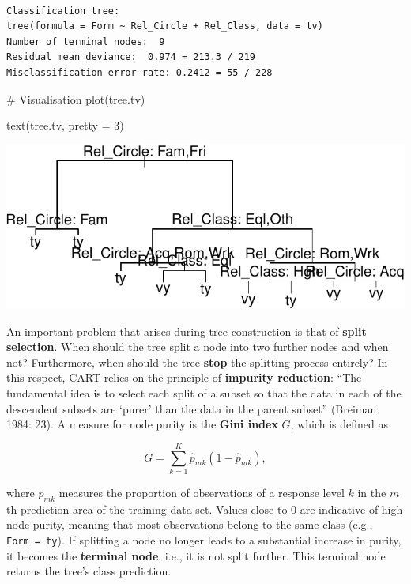 \documentclass[
  11pt,
  letterpaper,
  DIV=11,
  numbers=noendperiod]{scrreprt}
\newenvironment{Shaded}{\begin{snugshade}}{\end{snugshade}}
\newcommand{\AttributeTok}[1]{\textcolor[rgb]{0.40,0.45,0.13}{#1}}
\newcommand{\CommentTok}[1]{\textcolor[rgb]{0.37,0.37,0.37}{#1}}
\newcommand{\DecValTok}[1]{\textcolor[rgb]{0.68,0.00,0.00}{#1}}
\newcommand{\FunctionTok}[1]{\textcolor[rgb]{0.28,0.35,0.67}{#1}}
\newcommand{\NormalTok}[1]{\textcolor[rgb]{0.00,0.23,0.31}{#1}}
\begin{document}
\begin{verbatim}

Classification tree:
tree(formula = Form ~ Rel_Circle + Rel_Class, data = tv)
Number of terminal nodes:  9 
Residual mean deviance:  0.974 = 213.3 / 219 
Misclassification error rate: 0.2412 = 55 / 228 
\end{verbatim}

\begin{Shaded}
\begin{Highlighting}[]
\CommentTok{\# Visualisation}
\FunctionTok{plot}\NormalTok{(tree.tv)}

\FunctionTok{text}\NormalTok{(tree.tv, }\AttributeTok{pretty =} \DecValTok{3}\NormalTok{)}
\end{Highlighting}
\end{Shaded}

\includegraphics{Decision_trees_and_random_forests_files/figure-pdf/unnamed-chunk-4-1.pdf}

An important problem that arises during tree construction is that of
\textbf{split selection}. When should the tree split a node into two
further nodes and when not? Furthermore, when should the tree
\textbf{stop} the splitting process entirely? In this respect, CART
relies on the principle of \textbf{impurity reduction}: ``The
fundamental idea is to select each split of a subset so that the data in
each of the descendent subsets are `purer' than the data in the parent
subset'' (Breiman 1984: 23). A measure for node purity is the
\textbf{Gini index} \(G\), which is defined as

\[
G = \sum_{k=1}^{K}{\hat{p}_{mk}(1-\hat{p}_{mk}),}
\]

where \(\hat{p}_{mk}\) measures the proportion of observations of a
response level \(k\) in the \(m\)th prediction area of the training data
set. Values close to 0 are indicative of high node purity, meaning that
most observations belong to the same class (e.g., \texttt{Form\ =\ ty}).
If splitting a node no longer leads to a substantial increase in purity,
it becomes the \textbf{terminal node}, i.e., it is not split further.
This terminal node returns the tree's class prediction.
\end{document}
